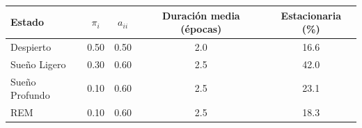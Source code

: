 \begin{tabular}{lcccc}
\toprule
\textbf{Estado} & \textbf{$\pi_i$} & \textbf{$a_{ii}$} & \textbf{Duración media (épocas)} & \textbf{Estacionaria (\%)} \\
\midrule
Despierto & 0.50 & 0.50 & 2.0 & 16.6 \\
Sueño Ligero & 0.30 & 0.60 & 2.5 & 42.0 \\
Sueño Profundo & 0.10 & 0.60 & 2.5 & 23.1 \\
REM & 0.10 & 0.60 & 2.5 & 18.3 \\
\bottomrule
\end{tabular}
